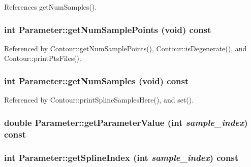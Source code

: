 References getNumSamples().\hypertarget{classParameter_e6a494adb7a970b6d9a1d6c242f600e6}{
\subsubsection[getNumSamplePoints]{\setlength{\rightskip}{0pt plus 5cm}int Parameter::getNumSamplePoints (void) const}}
\label{classParameter_e6a494adb7a970b6d9a1d6c242f600e6}




Referenced by Contour::getNumSamplePoints(), Contour::isDegenerate(), and Contour::printPtsFiles().\hypertarget{classParameter_51f0d8dc2f9c7c113be49351118902e2}{
\subsubsection[getNumSamples]{\setlength{\rightskip}{0pt plus 5cm}int Parameter::getNumSamples (void) const}}
\label{classParameter_51f0d8dc2f9c7c113be49351118902e2}




Referenced by Contour::printSplineSamplesHere(), and set().\hypertarget{classParameter_2f0b21ed83fb3a11305ee733a34317b2}{
\subsubsection[getParameterValue]{\setlength{\rightskip}{0pt plus 5cm}double Parameter::getParameterValue (int {\em sample\_\-index}) const}}
\label{classParameter_2f0b21ed83fb3a11305ee733a34317b2}


\hypertarget{classParameter_3f630390b0346479113e758df49ad21d}{
\subsubsection[getSplineIndex]{\setlength{\rightskip}{0pt plus 5cm}int Parameter::getSplineIndex (int {\em sample\_\-index}) const}}
\label{classParameter_3f630390b0346479113e758df49ad21d}


